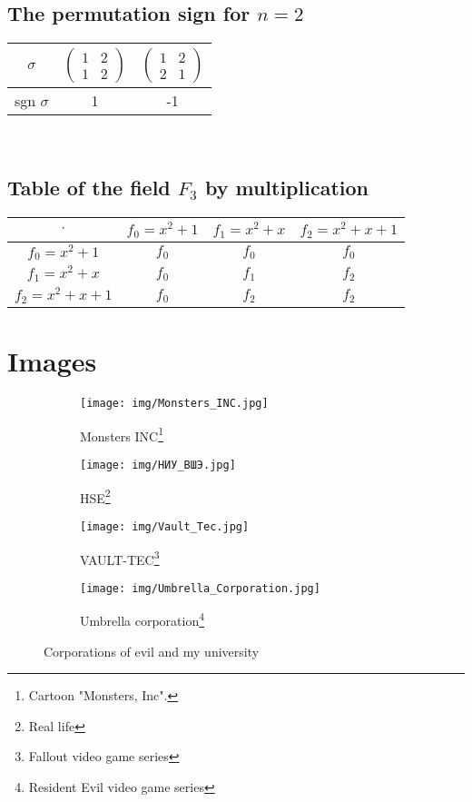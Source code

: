 \documentclass[14pt,a4paper]{report}
\begin{document}
\section{The permutation sign for $n = 2$}
\begin{tabular}{|c | c | c|}
    \hline
    $\sigma$
    & 
    $\begin{pmatrix}
        1 & 2 \\
        1 & 2
    \end{pmatrix} $
    &
    $\begin{pmatrix}
        1 & 2\\
        2 & 1
    \end{pmatrix} $
    \\ \hline
    sgn $\sigma$
    &
    1
    &
    -1
    \\ \hline
\end{tabular} \\


\section{Table of the field $F_{3}$ by multiplication}
\begin{tabular}{|c|c|c|c|}
\hline
  $\cdot$ & $f_{0} = x^2 + 1$ & $f_{1} = x^2 + x$ & $f_{2} = x^2 + x + 1$ \\
  \hline
  $f_{0} = x^2 + 1$ & $f_{0}$ & $f_{0}$ & $f_{0}$ \\
  \hline
  $f_{1} = x^2 + x$ & $f_{0}$ & $f_{1}$ & $f_{2}$ \\
  \hline
  $f_{2} = x^2 + x + 1$ & $f_{0}$ & $f_{2}$ & $f_{2}$ \\
\hline
\end{tabular}

\clearpage

\chapter{Images}

\begin{figure}
\begin{subfigure}{0.5\textwidth}
\texttt{[image: img/Monsters\_INC.jpg]} 
\caption{Monsters INC\footnote{Cartoon "Monsters, Inc".}}
\label{fig:subim1}
\end{subfigure}
\begin{subfigure}{0.5\textwidth}
\texttt{[image: img/НИУ\_ВШЭ.jpg]}
\caption{HSE\footnote{Real life}}
\label{fig:subim2}
\end{subfigure}
\begin{subfigure}{0.5\textwidth}
\texttt{[image: img/Vault\_Tec.jpg]}
\caption{VAULT-TEC\footnote{Fallout video game series}}
\label{fig:subim3}
\end{subfigure}
\begin{subfigure}{0.5\textwidth}
\texttt{[image: img/Umbrella\_Corporation.jpg]} 
\caption{Umbrella corporation\footnote{Resident Evil video game series}}
\label{fig:subim4}
\end{subfigure}
\caption{Corporations of evil and my  university}
\end{figure}
\end{document}
